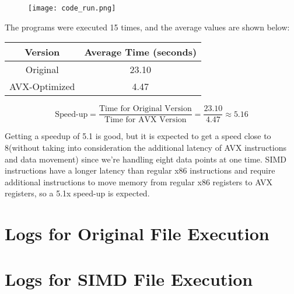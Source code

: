 \documentclass{article}
\newcommand{\zonenorm}{\textit{$Z$-score normalization}}
\begin{document}
\begin{figure}[!h]
    \centering
    \texttt{[image: code\_run.png]}
    \label{fig: proof}
\end{figure}
The programs were executed 15 times, and the average values are shown below:
\begin{table}[h!]
    \centering
    \begin{tabular}{|c|c|}
        \hline
        \textbf{Version} & \textbf{Average Time (seconds)} \\ \hline
        Original         & 23.10                           \\ \hline
        AVX-Optimized    & 4.47                            \\ \hline
    \end{tabular}
\end{table}
\[
    \text{Speed-up} = \frac{\text{Time for Original Version}}{\text{Time for AVX Version}} = \frac{23.10}{4.47} \approx 5.16
\]

Getting a speedup of 5.1 is good, but it is expected to get a speed close to 8(without taking into consideration the additional latency of AVX instructions and data movement)  since we're handling eight data points at one time.
SIMD instructions have a longer latency than regular x86 instructions and require additional instructions to move memory from regular x86 registers to AVX registers, so a 5.1x speed-up is expected.



\clearpage
\section{Logs for Original File Execution} \label{sec: original logs}


\clearpage
\section{Logs for SIMD File Execution} \label{sec: SIMD logs}

\end{document}
